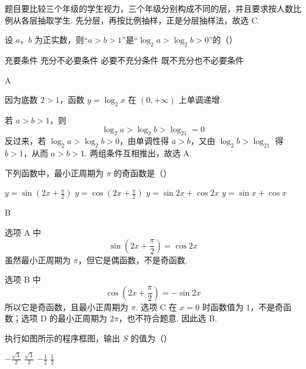 \begin{solution}
题目要比较三个年级的学生视力，三个年级分别构成不同的层，并且要求按人数比例从各层抽取学生. 先分层，再按比例抽样，正是分层抽样法，故选 C.
\end{solution}

\begin{problem}
设 \(a\)，\(b\) 为正实数，则“\(a>b>1\)”是“\(\log_2 a > \log_2 b > 0\)”的（\quad）

\choices
    {充要条件}
    {充分不必要条件}
    {必要不充分条件}
    {既不充分也不必要条件}
\end{problem}

\begin{answer}
A
\end{answer}

\begin{solution}
因为底数 \(2>1\)，函数 \(y=\log _2x\) 在 \((0,+\infty)\) 上单调递增.

若 \(a>b>1\)，则
\[
\log _2a>\log _2b>\log _21=0
\]
反过来，若 \(\log _2a>\log _2b>0\)，由单调性得 \(a>b\)，又由 \(\log _2b>\log _21\) 得 \(b>1\)，从而 \(a>b>1\). 两组条件互相推出，故选 A.
\end{solution}

\begin{problem}
下列函数中，最小正周期为 \(\pi\) 的奇函数是（\quad）

\choices
    {\( y = \sin \left(2x + \frac{\pi}{2}\right) \)}
    {\( y = \cos \left(2x + \frac{\pi}{2}\right) \)}
    {\( y = \sin 2x + \cos 2x \)}
    {\( y = \sin x + \cos x \)}
\end{problem}

\begin{answer}
B
\end{answer}

\begin{solution}
选项 A 中
\[
\sin\left(2x+\frac{\pi}{2}\right)=\cos 2x
\]
虽然最小正周期为 \(\pi\)，但它是偶函数，不是奇函数.

选项 B 中
\[
\cos\left(2x+\frac{\pi}{2}\right)=-\sin 2x
\]
所以它是奇函数，且最小正周期为 \(\pi\). 选项 C 在 \(x=0\) 时函数值为 \(1\)，不是奇函数；选项 D 的最小正周期为 \(2\pi\)，也不符合题意. 因此选 B.
\end{solution}

\begin{problem}
执行如图所示的程序框图，输出 \(S\) 的值为（\quad）


\choices
    {\(-\frac{\sqrt{3}}{2}\)}
    {\(\frac{\sqrt{3}}{2}\)}
    {\(-\frac{1}{2}\)}
    {\(\frac{1}{2}\)}
\end{problem}

